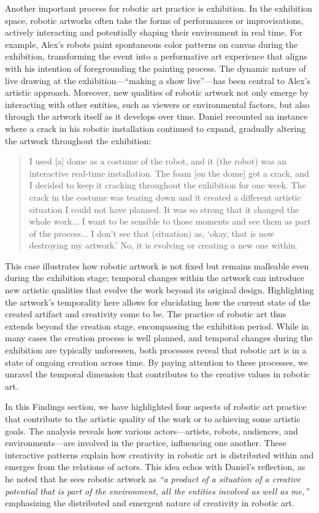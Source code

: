 Another important process for robotic art practice is exhibition. In the exhibition space, robotic artworks often take the forms of performances or improvisations, actively interacting and potentially shaping their environment in real time. 
For example, Alex's robots paint spontaneous color patterns on canvas during the exhibition, transforming the event into a performative art experience that aligns with his intention of foregrounding the painting process. The dynamic nature of live drawing at the exhibition---``making a show live''---has been central to Alex's artistic approach.
Moreover, new qualities of robotic artwork not only emerge by interacting with other entities, such as viewers or environmental factors, but also through the artwork itself as it develops over time. Daniel recounted an instance where a crack in his robotic installation continued to expand, gradually altering the artwork throughout the exhibition:

\begin{quote}
    I used [a] dome as a costume of the robot, and it (the robot) was an interactive real-time installation. The foam [on the dome] got a crack, and I decided to keep it cracking throughout the exhibition for one week. The crack in the costume was tearing down and it created a different artistic situation I could not have planned. It was so strong that it changed the whole work... I want to be sensible to those moments and see them as part of the process... I don't see that (situation) as, `okay, that is now destroying my artwork.' No, it is evolving or creating a new one within.
\end{quote}

This case illustrates how robotic artwork is not fixed but remains malleable even during the exhibition stage; temporal changes within the artwork can introduce new artistic qualities that evolve the work beyond its original design. Highlighting the artwork's temporality here allows for elucidating how the current state of the created artifact and creativity come to be. The practice of robotic art thus extends beyond the creation stage, encompassing the exhibition period. While in many cases the creation process is well planned, and temporal changes during the exhibition are typically unforeseen, both processes reveal that robotic art is in a state of ongoing creation across time. By paying attention to these processes, we unravel the temporal dimension that contributes to the creative values in robotic art.

In this Findings section, we have highlighted four aspects of robotic art practice that contribute to the artistic quality of the work or to achieving some artistic goals. The analysis reveals how various actors—artists, robots, audiences, and environments---are involved in the practice, influencing one another. These interactive patterns explain how creativity in robotic art is distributed within and emerges from the relations of actors. This idea echos with Daniel's reflection, as he noted that he sees robotic artwork as \textit{``a product of a situation of a creative potential that is part of the environment, all the entities involved as well as me,''} emphasizing the distributed and emergent nature of creativity in robotic art.
